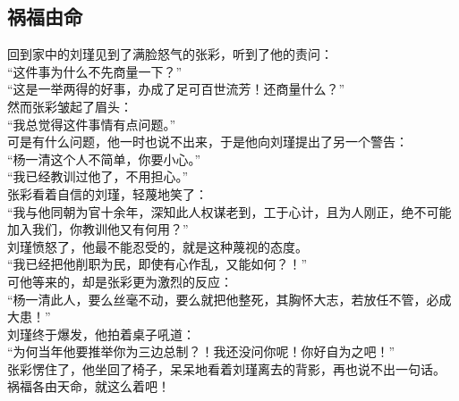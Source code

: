 	\begin{multicols}{\theparacolNo}
\fi
\subsection{祸福由命}
回到家中的刘瑾见到了满脸怒气的张彩，听到了他的责问：\\

“这件事为什么不先商量一下？”\\

“这是一举两得的好事，办成了足可百世流芳！还商量什么？”\\

然而张彩皱起了眉头：\\

“我总觉得这件事情有点问题。”\\

可是有什么问题，他一时也说不出来，于是他向刘瑾提出了另一个警告：\\

“杨一清这个人不简单，你要小心。”\\

“我已经教训过他了，不用担心。”\\

张彩看着自信的刘瑾，轻蔑地笑了：\\

“我与他同朝为官十余年，深知此人权谋老到，工于心计，且为人刚正，绝不可能加入我们，你教训他又有何用？”\\

刘瑾愤怒了，他最不能忍受的，就是这种蔑视的态度。\\

“我已经把他削职为民，即使有心作乱，又能如何？！”\\

可他等来的，却是张彩更为激烈的反应：\\

“杨一清此人，要么丝毫不动，要么就把他整死，其胸怀大志，若放任不管，必成大患！”\\

刘瑾终于爆发，他拍着桌子吼道：\\

“为何当年他要推举你为三边总制？！我还没问你呢！你好自为之吧！”\\

张彩愣住了，他坐回了椅子，呆呆地看着刘瑾离去的背影，再也说不出一句话。\\

祸福各由天命，就这么着吧！\\


\end{multicols}
